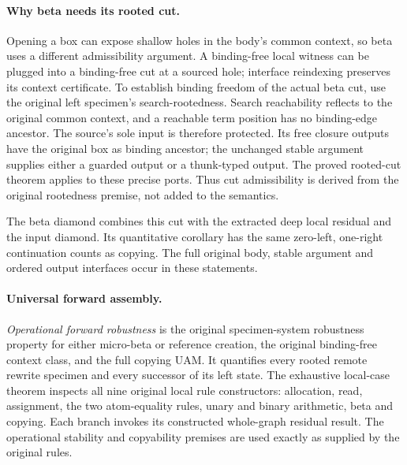 

\paragraph{Why beta needs its rooted cut.}
Opening a box can expose shallow holes in the body's common context, so
beta uses a different admissibility argument. A binding-free local witness
can be plugged into a binding-free cut at a sourced hole; interface
reindexing preserves its context certificate. To establish binding freedom
of the actual beta cut, use the original left specimen's search-rootedness.
Search reachability reflects to the original common context, and a reachable
term position has no binding-edge ancestor. The source's sole input is
therefore protected. Its free closure outputs have the original box as
binding ancestor; the unchanged stable argument supplies either a guarded
output or a thunk-typed output. The proved rooted-cut theorem applies to
these precise ports. Thus cut admissibility is derived from the original
rootedness premise, not added to the semantics.

The beta diamond combines this cut with the extracted deep local residual
and the input diamond. Its quantitative corollary has the same zero-left,
one-right continuation counts as copying. The full original body, stable
argument and ordered output interfaces occur in these statements.





\paragraph{Universal forward assembly.}
\emph{Operational forward robustness} is the original specimen-system
robustness property for either micro-beta or reference creation, the
original binding-free context class, and the full copying UAM. It quantifies
every rooted remote rewrite specimen and every successor of its left state.
The exhaustive local-case theorem inspects all nine original local rule
constructors: allocation, read, assignment, the two atom-equality rules,
unary and binary arithmetic, beta and copying. Each branch invokes its
constructed whole-graph residual result. The operational stability and
copyability premises are used exactly as supplied by the original rules.

